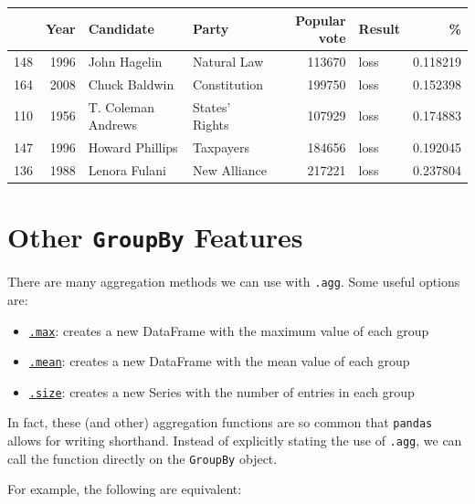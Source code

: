\documentclass[
  letterpaper,
  DIV=11,
  numbers=noendperiod]{scrreprt}
\providecommand{\tightlist}{%
  \setlength{\itemsep}{0pt}\setlength{\parskip}{0pt}}\usepackage{longtable,booktabs,array}
\begin{document}
\begin{tabular}{lrllrlr}
\toprule
{} &  Year &           Candidate &           Party &  Popular vote & Result &         \% \\
\midrule
148 &  1996 &        John Hagelin &     Natural Law &        113670 &   loss &  0.118219 \\
164 &  2008 &       Chuck Baldwin &    Constitution &        199750 &   loss &  0.152398 \\
110 &  1956 &  T. Coleman Andrews &  States' Rights &        107929 &   loss &  0.174883 \\
147 &  1996 &     Howard Phillips &       Taxpayers &        184656 &   loss &  0.192045 \\
136 &  1988 &       Lenora Fulani &    New Alliance &        217221 &   loss &  0.237804 \\
\bottomrule
\end{tabular}

\hypertarget{other-groupby-features}{%
\section{\texorpdfstring{Other \texttt{GroupBy}
Features}{Other GroupBy Features}}\label{other-groupby-features}}

There are many aggregation methods we can use with \texttt{.agg}. Some
useful options are:

\begin{itemize}
\tightlist
\item
  \href{https://pandas.pydata.org/pandas-docs/stable/reference/api/pandas.core.groupby.GroupBy.max.html}{\texttt{.max}}:
  creates a new DataFrame with the maximum value of each group
\item
  \href{https://pandas.pydata.org/pandas-docs/stable/reference/api/pandas.core.groupby.GroupBy.mean.html}{\texttt{.mean}}:
  creates a new DataFrame with the mean value of each group
\item
  \href{https://pandas.pydata.org/pandas-docs/stable/reference/api/pandas.core.groupby.GroupBy.size.html}{\texttt{.size}}:
  creates a new Series with the number of entries in each group
\end{itemize}

In fact, these (and other) aggregation functions are so common that
\texttt{pandas} allows for writing shorthand. Instead of explicitly
stating the use of \texttt{.agg}, we can call the function directly on
the \texttt{GroupBy} object.

For example, the following are equivalent:
\end{document}

